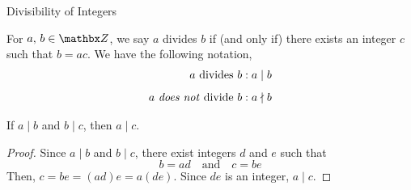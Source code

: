 \begin{mdframed}
\begin{center}
{\Large Divisibility of Integers}
\end{center}
\end{mdframed}

\begin{definition}
For $a,\,b \in \zz$, we say $a$ divides $b$ if (and only if) there exists an integer $c$ such that $b = ac$. We have the following notation,
\begin{align*}
\text{$a$ divides $b$}&:a\mid b\\[0.5em]
\text{$a$ \emph{does not} divide $b$}&:a\nmid b
\end{align*}
\end{definition}

\vspace*{1em}

\begin{lemma}
If $a\mid b$ and $b \mid c$, then $a\mid c$.
\end{lemma}
\begin{proof}
Since $a\mid b$ and $b \mid c$, there exist integers $d$ and $e$ such that
\[b = ad \quad \text{and} \quad c = be\]
Then, $c = be = (ad)e = a(de)$. Since $de$ is an integer, $a\mid c$. 
\end{proof}

\vspace*{1em}

